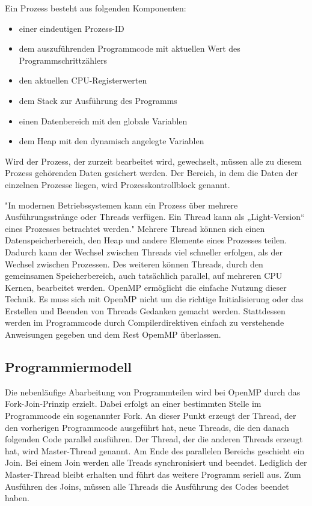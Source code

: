 \documentclass[../main.tex]{subfiles}
\begin{document}
Ein Prozess besteht aus folgenden Komponenten:
\begin{itemize}
	\item einer eindeutigen Prozess-ID
	\item dem auszuführenden Programmcode mit aktuellen Wert des Programmschrittzählers
	\item den aktuellen CPU-Registerwerten
	\item dem Stack zur Ausführung des Programms
	\item einen Datenbereich mit den globale Variablen
	\item dem Heap mit den dynamisch angelegte Variablen
\end{itemize} \cite{articleOpenMP}

Wird der Prozess, der zurzeit bearbeitet wird, gewechselt, müssen alle zu diesem Prozess gehörenden Daten gesichert werden. Der Bereich, in dem die Daten der einzelnen Prozesse liegen, wird Prozesskontrollblock genannt.

"In modernen Betriebssystemen kann ein Prozess über mehrere Ausführungsstränge oder Threads verfügen. Ein Thread kann als „Light-Version“ eines Prozesses betrachtet werden." \cite{articleOpenMP}
Mehrere Thread können sich einen Datenspeicherbereich, den Heap und andere Elemente eines Prozesses teilen. Dadurch kann der Wechsel zwischen Threads viel schneller erfolgen, als der Wechsel zwischen Prozessen. Des weiteren können Threads, durch den gemeinsamen Speicherbereich, auch tatsächlich parallel, auf mehreren CPU Kernen, bearbeitet werden.
OpenMP ermöglicht die einfache Nutzung dieser Technik. Es muss sich mit OpenMP nicht um die richtige Initialisierung oder das Erstellen und Beenden von Threads Gedanken gemacht werden. Stattdessen werden im Programmcode durch Compilerdirektiven einfach zu verstehende Anweisungen gegeben und dem Rest OpemMP überlassen. \cite{articleOpenMP}

\subsection{Programmiermodell}

Die nebenläufige Abarbeitung von Programmteilen wird bei OpenMP durch das Fork-Join-Prinzip erzielt. Dabei erfolgt an einer bestimmten Stelle im Programmcode ein sogenannter Fork. An dieser Punkt erzeugt der Thread, der den vorherigen Programmcode ausgeführt hat, neue Threads, die den danach folgenden Code parallel ausführen. Der Thread, der die anderen Threads erzeugt hat, wird Master-Thread genannt. Am Ende des parallelen Bereichs geschieht ein Join. Bei einem Join werden alle Treads synchronisiert und beendet. Lediglich der Master-Thread bleibt erhalten und führt das weitere Programm seriell aus. Zum Ausführen des Joins, müssen alle Threads die Ausführung des Codes beendet haben.
\end{document}
